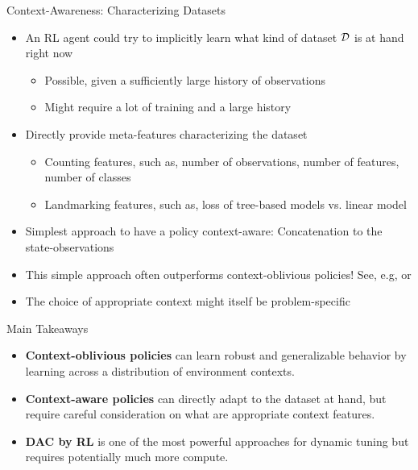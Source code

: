\documentclass[main]{subfiles}
\begin{document}
\begin{frame}{Context-Awareness: Characterizing Datasets}
    \begin{itemize}
        \item An RL agent could try to implicitly learn what kind of dataset $\mathcal{D}$ is at hand right now\pause
        \begin{itemize}
            \item Possible, given a sufficiently large history of observations
            \item Might require a lot of training and a large history
        \end{itemize}\pause
        \item Directly provide meta-features characterizing the dataset
        \begin{itemize}
            \item Counting features, such as, number of observations, number of features, number of classes
            \item Landmarking features, such as, loss of tree-based models vs. linear model
        \end{itemize}\pause
        \item Simplest approach to have a policy context-aware: Concatenation to the state-observations 
        \item This simple approach often outperforms context-oblivious policies! See, e.g,  or \pause
        \item The choice of appropriate context might itself be problem-specific
    \end{itemize}
\end{frame}
\begin{frame}{Main Takeaways} 


\begin{itemize}
    \item \textbf{Context-oblivious policies} can learn robust and generalizable behavior by learning across a distribution of environment contexts.
    \item \textbf{Context-aware policies} can directly adapt to the dataset at hand, but require careful consideration on what are appropriate context features.
    \item \textbf{DAC by RL} is one of the most powerful approaches for dynamic tuning but requires potentially much more compute.
\end{itemize}

\end{frame}
\end{document}
